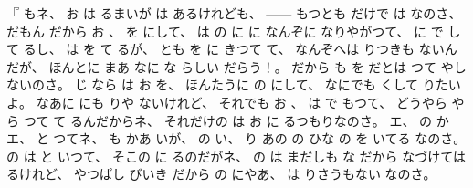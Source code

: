 %
『
もネ、
%
お
は
るまいが
は
あるけれども、
{---}{---}
もつとも
%
だけで
は
なのさ、
%
だもん
だから
お
、
%
を
にして、
%
は
の
に
に
なんぞに
なりやがつて、
%
に
で
して
るし、
%
は
を
て
るが、
%
とも
を
に
きつて
て、
%
なんぞへは
りつきも
ないんだが、
%
ほんとに
まあ
なに
な
らしい
だらう！。
%
だから
も
を
だとは
つて
やしないのさ。
%
じ
なら
は
お
を、
%
ほんたうに
の
にして、
%
なにでも
くして
りたいよ。
%
なあに
にも
りや
ないけれど、
%
それでも
お
、
%
は
で
もつて、
%
どうやら
やら
つて
て
るんだからネ、
%
それだけの
は
お
に
るつもりなのさ。
%
エ、
%
の
かエ、
%
%
と
つてネ、
%
も
かあ
いが、
%
の
い、
%
り
あの
の
ひな
の
を
いてる
なのさ。
%
の
は
と
いつて、
%
そこの
に
るのだがネ、
%
の
は
まだしも
な
だから
なづけては
るけれど、
%
やつぱし
びいき
だから
の
にやあ、
%
は
りさうもない
なのさ。
%
